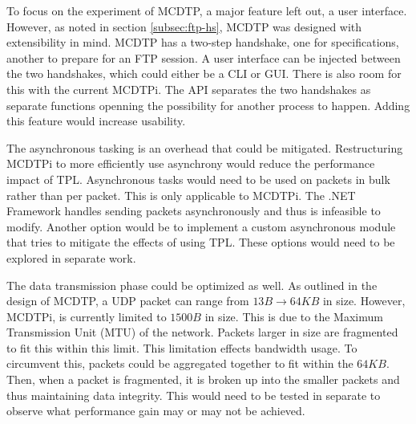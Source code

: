 To focus on the experiment of MCDTP, a major feature left out, a user interface. However, as noted in section \ref{subsec:ftp-hs}, MCDTP was designed with extensibility in mind. MCDTP has a two-step handshake, one for specifications, another to prepare for an FTP session. A user interface can be injected between the two handshakes, which could either be a CLI or GUI. There is also room for this with the current MCDTPi. The API separates the two handshakes as separate functions openning the possibility for another process to happen. Adding this feature would increase usability.

The asynchronous tasking is an overhead that could be mitigated. Restructuring MCDTPi to more efficiently use asynchrony would reduce the performance impact of TPL. Asynchronous tasks would need to be used on packets in bulk rather than per packet. This is only applicable to MCDTPi. The .NET Framework handles sending packets asynchronously and thus is infeasible to modify. Another option would be to implement a custom asynchronous module that tries to mitigate the effects of using TPL. These options would need to be explored in separate work.

The data transmission phase could be optimized as well. As outlined in the design of MCDTP, a UDP packet can range from $13B \rightarrow 64KB$ in size. However, MCDTPi, is currently limited to $1500B$ in size. This is due to the Maximum Transmission Unit (MTU) of the network. Packets larger in size are fragmented to fit this within this limit. This limitation effects bandwidth usage. To circumvent this, packets could be aggregated together to fit within the $64KB$. Then, when a packet is fragmented, it is broken up into the smaller packets and thus maintaining data integrity. This would need to be tested in separate to observe what performance gain may or may not be achieved.